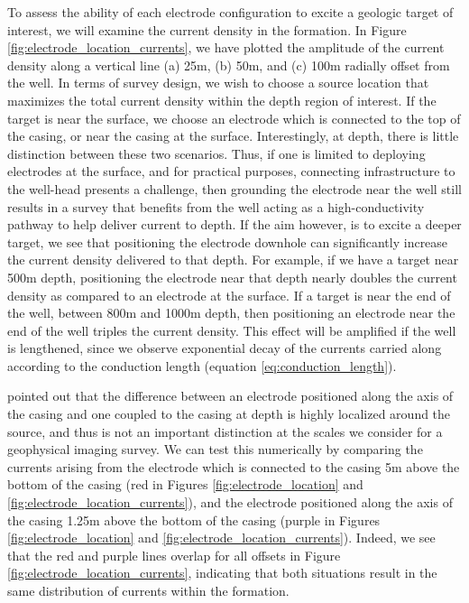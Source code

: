 

To assess the ability of each electrode configuration to excite a geologic target of interest, we will examine the current density in the formation. In Figure \ref{fig:electrode_location_currents}, we have plotted the amplitude of the current density along a vertical line (a) 25m, (b) 50m, and (c) 100m radially offset from the well. In terms of survey design, we wish to choose a source location that maximizes the total current density within the depth region of interest. If the target is near the surface, we choose an electrode which is connected to the top of the casing, or near the casing at the surface. Interestingly, at depth, there is little distinction between these two scenarios. Thus, if one is limited to deploying electrodes at the surface, and for practical purposes, connecting infrastructure to the well-head presents a challenge, then grounding the electrode near the well still results in a survey that benefits from the well acting as a high-conductivity pathway to help deliver current to depth. If the aim however, is to excite a deeper target, we see that positioning the electrode downhole can significantly increase the current density delivered to that depth. For example, if we have a target near 500m depth, positioning the electrode near that depth nearly doubles the current density as compared to an electrode at the surface. If a target is near the end of the well, between 800m and 1000m depth, then positioning an electrode near the end of the well triples the current density. This effect will be amplified if the well is lengthened, since we observe exponential decay of the currents carried along according to the conduction length (equation \ref{eq:conduction_length}).

\cite{Kaufman1990} pointed out that the difference between an electrode positioned along the axis of the casing and one coupled to the casing at depth is highly localized around the source, and thus is not an important distinction at the scales we consider for a geophysical imaging survey. We can test this numerically by comparing the currents arising from the electrode which is connected to the casing 5m above the bottom of the casing (red in Figures \ref{fig:electrode_location} and \ref{fig:electrode_location_currents}), and the electrode positioned along the axis of the casing 1.25m above the bottom of the casing (purple in Figures \ref{fig:electrode_location} and \ref{fig:electrode_location_currents}). Indeed, we see that the red and purple lines overlap for all offsets in Figure \ref{fig:electrode_location_currents}, indicating that both situations result in the same distribution of currents within the formation.

